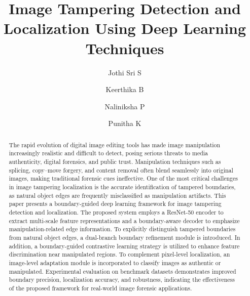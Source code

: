 \documentclass[runningheads]{llncs}
\begin{document}
\title{Image Tampering Detection and Localization Using Deep Learning Techniques}

\author{Jothi Sri S \and Keerthika B \and Naliniksha P \and Punitha K}



\maketitle

\begin{abstract} The rapid evolution of digital image editing tools has made image manipulation increasingly realistic and difficult to detect, posing serious threats to media authenticity, digital forensics, and public trust. Manipulation techniques such as splicing, copy--move forgery, and content removal often blend seamlessly into original images, making traditional forensic cues ineffective. One of the most critical challenges in image tampering localization is the accurate identification of tampered boundaries, as natural object edges are frequently misclassified as manipulation artifacts. This paper presents a boundary-guided deep learning framework for image tampering detection and localization. The proposed system employs a ResNet-50 encoder to extract multi-scale feature representations and a boundary-aware decoder to emphasize manipulation-related edge information. To explicitly distinguish tampered boundaries from natural object edges, a dual-branch boundary refinement module is introduced. In addition, a boundary-guided contrastive learning strategy is utilized to enhance feature discrimination near manipulated regions. To complement pixel-level localization, an image-level adaptation module is incorporated to classify images as authentic or manipulated. Experimental evaluation on benchmark datasets demonstrates improved boundary precision, localization accuracy, and robustness, indicating the effectiveness of the proposed framework for real-world image forensic applications.  \end{abstract}
\end{document}
